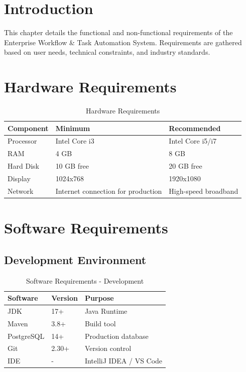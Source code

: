 \documentclass[12pt,a4paper,twoside]{book}
\begin{document}
\section{Introduction}

This chapter details the functional and non-functional requirements of the Enterprise Workflow \& Task Automation System. Requirements are gathered based on user needs, technical constraints, and industry standards.

\section{Hardware Requirements}

\begin{table}[H]
\centering
\begin{tabular}{|l|l|l|}
\hline
\textbf{Component} & \textbf{Minimum} & \textbf{Recommended} \\ \hline
Processor & Intel Core i3 & Intel Core i5/i7 \\ \hline
RAM & 4 GB & 8 GB \\ \hline
Hard Disk & 10 GB free & 20 GB free \\ \hline
Display & 1024x768 & 1920x1080 \\ \hline
Network & Internet connection for production & High-speed broadband \\ \hline
\end{tabular}
\caption{Hardware Requirements}
\end{table}

\section{Software Requirements}

\subsection{Development Environment}

\begin{table}[H]
\centering
\begin{tabular}{|l|l|l|}
\hline
\textbf{Software} & \textbf{Version} & \textbf{Purpose} \\ \hline
JDK & 17+ & Java Runtime \\ \hline
Maven & 3.8+ & Build tool \\ \hline
PostgreSQL & 14+ & Production database \\ \hline
Git & 2.30+ & Version control \\ \hline
IDE & - & IntelliJ IDEA / VS Code \\ \hline
\end{tabular}
\caption{Software Requirements - Development}
\end{table}
\end{document}

